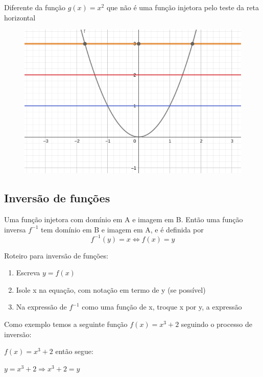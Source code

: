\begin{multicols*}{2}
    Diferente da função $g(x) = x^2$ que não é uma função injetora pelo teste da reta horizontal

    \begin{figure}[H]
        \centering
        \includegraphics[scale=0.3]{assets/rafael/img38.png}
    \end{figure}

    \subsection*{Inversão de funções}
    \begin{theorem}
        Uma função injetora com domínio em A e imagem em B. Então uma função inversa $f^{-1}$ tem 				domínio em B e imagem em A, e é definida por
        \[f^{-1}(y) = x \Leftrightarrow f(x) = y\]
    \end{theorem}

    Roteiro para inversão de funções:

    \begin{enumerate}
        \item Escreva $y = f(x)$
        \item Isole x na equação, com notação em termo de y (se possível)
        \item Na expressão de $f^{-1}$ como uma função de x, troque x por y, a expressão
    \end{enumerate}

    Como exemplo temos a seguinte função  $f(x) = x^3 +2$ seguindo o processo de 					inversão:

    $f(x) =x^3+2$ \quad então segue:

    $y = x^3 +2 \Rightarrow x^3 +2 = y $


\end{multicols*}
